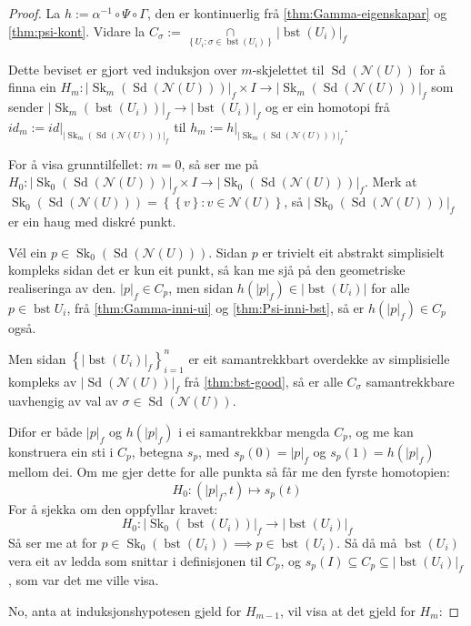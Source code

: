 \documentclass[a4paper, 12pt, norsk]{article}
\theoremstyle{plain}
\theoremstyle{definition}
\newcommand{\Nc}{\mathcal{N}}
\newcommand{\intersect}{ \mathop{\cap}\limits } %
\newcommand{\gr}[1]{ \lvert #1 \rvert } %
\newcommand{\set}[1]{ \left \{ #1 \right \} } %
\DeclareMathOperator{\Sd}{Sd}
\DeclareMathOperator{\bst}{bst}
\DeclareMathOperator{\Sk}{Sk}
\begin{document}
\begin{proof} %
	La \( h := \alpha^{-1} \circ \Psi \circ \Gamma \), den er kontinuerlig frå \autoref{thm:Gamma-eigenskapar} og \autoref{thm:psi-kont}. Vidare la \( C_\sigma := \intersect_{\set{ U_i : \sigma \in \bst(U_i) }} \gr{\bst(U_i)}_f \)

	Dette beviset er gjort ved induksjon over \( m \)-skjelettet til \( \Sd(\Nc(U)) \) for å finna ein \( H_m : \gr{\Sk_m(\Sd(\Nc(U)))}_f \times I \to \gr{\Sk_m(\Sd(\Nc(U)))}_f \) som sender \( \gr{\Sk_m(\bst(U_i))}_f \to \gr{\bst(U_i)}_f \) og er ein homotopi frå \( id_m := id|_{\gr{\Sk_m(\Sd(\Nc(U)))}_f} \) til \( h_m := h|_{\gr{\Sk_m(\Sd(\Nc(U)))}_f} \).

	For å visa grunntilfellet: \( m = 0 \), så ser me på \( H_0: \gr{\Sk_0(\Sd(\Nc(U)))}_f \times I \to \gr{\Sk_0(\Sd(\Nc(U)))}_f \). Merk at \( \Sk_0(\Sd(\Nc(U))) = \set{\set{v} : v \in \Nc(U)} \), så \( \gr{\Sk_0(\Sd(\Nc(U)))}_f \) er ein haug med diskré punkt.

	Vél ein \( p \in \Sk_0(\Sd(\Nc(U))) \). Sidan \( p \) er trivielt eit abstrakt simplisielt kompleks sidan det er kun eit punkt, så kan me sjå på den geometriske realiseringa av den. \( \gr{p}_f \in C_p \), men sidan \( h(\gr{p}_f) \in \gr{\bst(U_i)} \) for alle \( p \in \bst{U_i} \), frå \autoref{thm:Gamma-inni-ui} og \autoref{thm:Psi-inni-bst}, så er \( h(\gr{p}_f) \in C_p \) også.

	Men sidan \( \set{\gr{\bst(U_i)}_f}_{i = 1}^{n} \) er eit samantrekkbart overdekke av simplisielle kompleks av \( \gr{\Sd(\Nc(U))}_f \) frå \autoref{thm:bst-good}, så er alle \( C_\sigma \) samantrekkbare uavhengig av val av \( \sigma \in \Sd(\Nc(U)) \).

	Difor er både \( \gr{p}_f \) og \( h(\gr{p}_f) \) i ei samantrekkbar mengda \( C_p \), og me kan konstruera ein sti i \( C_p \), betegna \( s_p \), med \( s_p(0) = \gr{p}_f \) og \( s_p(1) = h(\gr{p}_f) \) mellom dei. Om me gjer dette for alle punkta så får me den fyrste homotopien:
	\[
		H_0 : (\gr{p}_f, t) \mapsto s_p(t)
	\]
	For å sjekka om den oppfyllar kravet:
	\[
		H_0: \gr{\Sk_0(\bst(U_i))}_f \to \gr{\bst(U_i)}_f
	\]
	Så ser me at for \( p \in \Sk_0(\bst(U_i)) \implies p \in \bst(U_i) \). Så då må \( \bst(U_i) \) vera eit av ledda som snittar i definisjonen til \( C_p \), og \( s_p(I) \subseteq C_p \subseteq \gr{\bst(U_i)}_f \), som var det me ville visa.

	No, anta at induksjonshypotesen gjeld for \( H_{m-1} \), vil visa at det gjeld for \( H_m \):


\end{proof}
\end{document}
